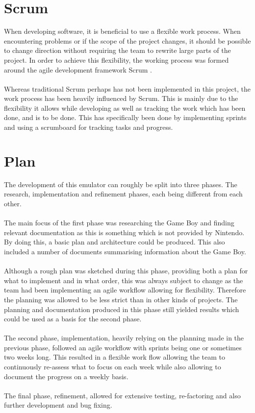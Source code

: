 \section{Scrum}
When developing software, it is beneficial to use a flexible work process. When encountering problems or if the scope of the project changes, it should be possible to change direction without requiring the team to rewrite large parts of the project. In order to achieve this flexibility, the working process was formed around the agile development framework Scrum \cite{Scrum}.
\\\\
Whereas traditional Scrum perhaps has not been implemented in this project, the work process has been heavily influenced by Scrum. This is mainly due to the flexibility it allows while developing as well as tracking the work which has been done, and is to be done. This has specifically been done by implementing sprints and using a scrumboard for tracking tasks and progress. 
\vspace{-0.0cm}
\section{Plan}
The development of this emulator can roughly be split into three phases. The research, implementation and refinement phases, each being different from each other.
\\\\
The main focus of the first phase was researching the Game Boy and finding relevant documentation as this is something which is not provided by Nintendo. By doing this, a basic plan and architecture could be produced. This also included a number of documents summarising information about the Game Boy.
\\\\
Although a rough plan was sketched during this phase, providing both a plan for what to implement and in what order, this was always subject to change as the team had been implementing an agile  workflow allowing for flexibility. Therefore the planning was allowed to be less strict than in other kinds of projects. The planning and documentation produced in this phase still yielded results which could be used as a basis for the second phase. %
\\\\
The second phase, implementation, heavily relying on the planning made in the previous phase, followed an agile workflow with sprints being one or sometimes two weeks long. This resulted in a flexible work flow allowing the team to continuously re-assess what to focus on each week while also allowing to document the progress on a weekly basis.
\\\\
The final phase, refinement, allowed for extensive testing, re-factoring and also further development and bug fixing.

